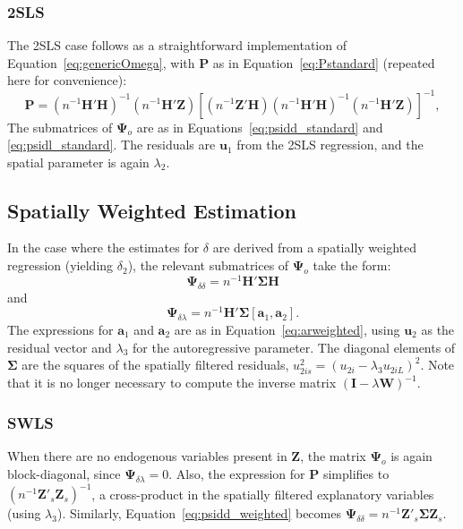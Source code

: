 \documentclass{article}
\begin{document}
\subsubsection{2SLS}\label{ss:asyvar2sls}
The 2SLS case follows as a straightforward implementation of Equation~\ref{eq:genericOmega},
with $\mathbf{P}$ as in Equation~\ref{eq:Pstandard} (repeated here for convenience):
\begin{equation*}
\mathbf{P} = (n^{-1}\mathbf{H'H})^{-1} ( n^{-1} \mathbf{H'Z} ) 
        [ (n^{-1} \mathbf{Z'H} ) (n^{-1} \mathbf{H'H} )^{-1} (n^{-1} \mathbf{H'Z}) ]^{-1},
\end{equation*}
The submatrices of $\mathbf{\Psi}_o$ are as in Equations~\ref{eq:psidd_standard}
and \ref{eq:psidl_standard}. The residuals are $\mathbf{u}_1$ from the 2SLS regression,
and the spatial parameter is again $\lambda_2$.

\subsection{Spatially Weighted Estimation}\label{ss:asyvarweighted}
In the case where the estimates for $\delta$ are derived from a spatially weighted
regression (yielding $\delta_2$), the relevant submatrices of $\mathbf{\Psi}_o$ take the form:
\begin{equation}\label{eq:psidd_weighted}
\mathbf{\Psi}_{\delta \delta} = n^{-1} \mathbf{H'}  \mathbf{\Sigma}
 \mathbf{H}
\end{equation}
and
\begin{equation}\label{eq:psidl_weighted}
\mathbf{\Psi}_{\delta \lambda} = n^{-1} \mathbf{H'} \mathbf{\Sigma} [ \mathbf{a}_1, \mathbf{a}_2 ].
\end{equation}
The expressions for $\mathbf{a}_1$ and $\mathbf{a}_2$ are as in Equation~\ref{eq:arweighted}, using  $\mathbf{u}_2$ as the residual vector and $\lambda_3$ for the 
autoregressive parameter. The diagonal elements
of $\mathbf{\Sigma}$ are the squares of the spatially filtered residuals, $u_{2is}^2 = (u_{2i} - \lambda_3 u_{2iL} )^{2}$.
Note that it is no longer necessary to compute the inverse matrix $( \mathbf{I} - \lambda \mathbf{W} )^{-1}$. 

\subsubsection{SWLS}
When there are no endogenous variables present in $\mathbf{Z}$, the matrix $\mathbf{\Psi}_o$
is again block-diagonal, since $\mathbf{\Psi}_{\delta \lambda} = 0$. Also, the expression for 
$\mathbf{P}$ simplifies to $(n^{-1} \mathbf{Z'}_s\mathbf{Z}_s )^{-1}$, a cross-product in the
spatially filtered explanatory variables (using $\lambda_3$). Similarly, 
Equation~\ref{eq:psidd_weighted} becomes $\mathbf{\Psi}_{\delta \delta} = n^{-1} \mathbf{Z'}_s \mathbf{\Sigma} \mathbf{Z}_s$.
\end{document}
